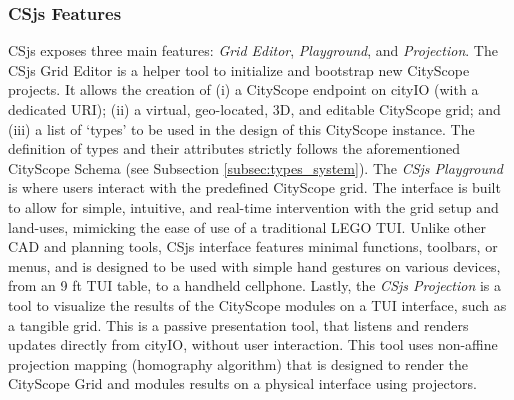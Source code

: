 {{      \subsubsection{CSjs Features}
      {
          CSjs exposes three main features: \textit{Grid Editor}, \textit{Playground}, and \textit{Projection}. The CSjs Grid Editor is a helper tool to initialize and bootstrap new CityScope projects. It allows the creation of (i) a CityScope endpoint on cityIO (with a dedicated URI); (ii) a virtual, geo-located, 3D, and editable CityScope grid; and (iii) a list of `types' to be used in the design of this CityScope instance. The definition of types and their attributes strictly follows the aforementioned CityScope Schema (see Subsection \eqref{subsec:types_system}).
          \newline
          The \textit{CSjs Playground} is where users interact with the predefined CityScope grid. The interface is built to allow for simple, intuitive, and real-time intervention with the grid setup and land-uses, mimicking the ease of use of a traditional LEGO TUI. Unlike other CAD and planning tools, CSjs interface features minimal functions, toolbars, or menus, and is designed to be used with simple hand gestures on various devices, from an 9 ft TUI table, to a handheld cellphone.
          \newline
          Lastly, the \textit{CSjs Projection} is a tool to visualize the results of the CityScope modules on a TUI interface, such as a tangible grid. This is a passive presentation tool, that listens and renders updates directly from cityIO, without user interaction. This tool uses non-affine projection mapping (homography algorithm) that is designed to render the CityScope Grid and modules results on a physical interface using projectors.
      }

}}
